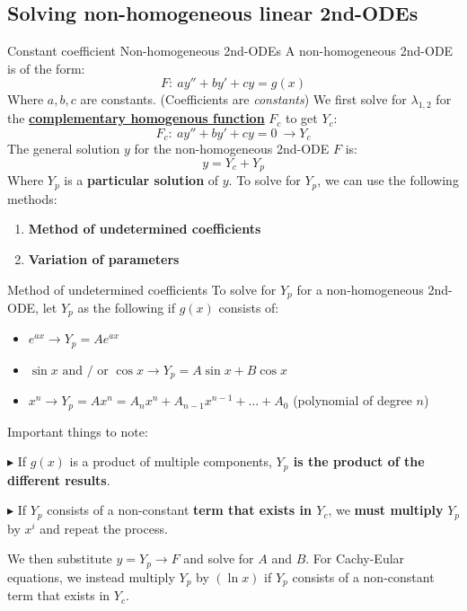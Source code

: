 \documentclass{article}
\begin{document}
\subsection{Solving non-homogeneous linear 2nd-ODEs}
\begin{definition}
    {Constant coefficient Non-homogeneous 2nd-ODEs}
    A non-homogeneous 2nd-ODE is of the form:
    \[F:\ ay''+by'+cy=g(x)\]
    Where $a,b,c$ are constants. (Coefficients are \emph{constants})
    \tcblower
    We first solve for $\lambda_{1,2}$ for the \hyperref[sec:homogeneous]{\textbf{complementary homogenous function}} $F_c$ to get $Y_c$:
    \[F_c:\ ay''+by'+cy=0\ \to Y_c\]
    The general solution $y$ for the non-homogeneous 2nd-ODE $F$ is:
    \[y=Y_c+Y_p\]
    Where $Y_p$ is a \textbf{particular solution} of $y$. To solve for $Y_p$, we can use the following methods:
    \begin{enumerate}
        \item \textbf{Method of undetermined coefficients}
        \item \textbf{Variation of parameters}
    \end{enumerate}
\end{definition}

\begin{theorem}
    {Method of undetermined coefficients}
    To solve for $Y_p$ for a non-homogeneous 2nd-ODE, let $Y_p$ as the following if $g(x)$ consists of:
    \begin{itemize}
        \item $e^{ax}\to Y_p=Ae^{ax}$
        \item $\sin x\text{ and / or }\cos x\to Y_p=A\sin x+B\cos x$
        \item $x^n\to Y_p=Ax^n=A_nx^n+A_{n-1}x^{n-1}+\dots+A_0$ (polynomial of degree $n$)
    \end{itemize}
    Important things to note:

    $\blacktriangleright $ If $g(x)$ is a product of multiple components, \textbf{$Y_p$ is the product of the different results}.

    $\blacktriangleright $ If $Y_p$ consists of a non-constant \textbf{term that exists in $Y_c$}, we \textbf{must multiply} $Y_p$ by $x^i$ and repeat the process.


    We then substitute $y=Y_p\to F$ and solve for $A$ and $B$.
    \tcblower
    For Cachy-Eular equations, we instead multiply $Y_p$ by $(\ln x)$ if $Y_p$ consists of a non-constant term that exists in $Y_c$.
\end{theorem}
\end{document}
